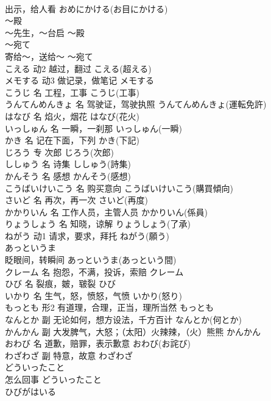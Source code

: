 \documentclass[8pt]{extreport}
\begin{document}
\begin{CJK}{UTF8}{min}
\\	出示，给人看	おめにかける(お目にかける)	
\\	～殿	
\\	～先生，～台启	～殿	
\\	～宛て	
\\	寄给～，送给～	～宛て	
\\	こえる	动2	越过，翻过	こえる(超える)	
\\	メモする	动3	做记录，做笔记	メモする	
\\	こうじ	名	工程，工事	こうじ(工事)	
\\	うんてんめんきょ	名	驾驶证，驾驶执照	うんてんめんきょ(運転免許)	
\\	はなび	名	焰火，烟花	はなび(花火)	
\\	いっしゅん	名	一瞬，一刹那	いっしゅん(一瞬)	
\\	かき	名	记在下面，下列	かき(下記)	
\\	じろう	专	次郎	じろう(次郎)	
\\	ししゅう	名	诗集	ししゅう(詩集)	
\\	かんそう	名	感想	かんそう(感想)	
\\	こうばいけいこう	名	购买意向	こうばいけいこう(購買傾向)	
\\	さいど	名	再次，再一次	さいど(再度)	
\\	かかりいん	名	工作人员，主管人员	かかりいん(係員)	
\\	りょうしょう	名	知晓，谅解	りょうしょう(了承)	
\\	ねがう	动1	请求，要求，拜托	ねがう(願う)	
\\	あっというま	
\\	眨眼间，转瞬间	あっというま(あっという間)	
\\	クレーム	名	抱怨，不满，投诉，索赔	クレーム	
\\	ひび	名	裂痕，皴，皲裂	ひび	
\\	いかり	名	生气，怒，愤怒，气愤	いかり(怒り)	
\\	もっとも	形2	有道理，合理，正当，理所当然	もっとも	
\\	なんとか	副	无论如何，想方设法，千方百计	なんとか(何とか)	
\\	かんかん	副	大发脾气，大怒；（太阳）火辣辣，（火）熊熊	かんかん	
\\	おわび	名	道歉，赔罪，表示歉意	おわび(お詫び)	
\\	わざわざ	副	特意，故意	わざわざ	
\\	どういったこと	
\\	怎么回事	どういったこと	
\\	ひびがはいる	

\end{CJK}
\end{document}
